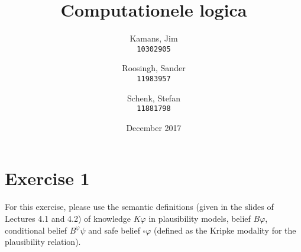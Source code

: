 \documentclass[leqno]{article}
\title{Computationele logica}
\author{
    Kamans, Jim\\
    \texttt{10302905}
    \and
    Roosingh, Sander\\
    \texttt{11983957}
    \and
    Schenk, Stefan\\
    \texttt{11881798}
}
\date{December 2017}
\begin{document}
\maketitle

%
%
%


\section*{Exercise 1}
For this exercise, please use the semantic definitions (given in the slides of
Lectures 4.1 and 4.2) of knowledge $K\varphi$ in plausibility models, belief
$B\varphi$, conditional belief $B^\varphi \psi$ and safe belief $\square
\varphi$ (defined as the Kripke modality for the plausibility relation).
\end{document}
